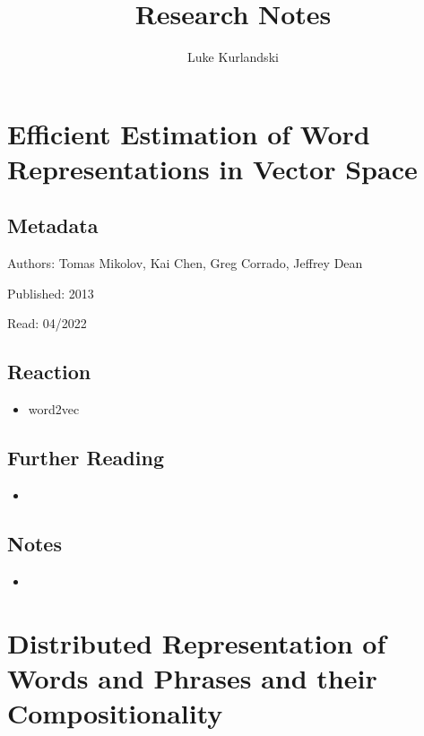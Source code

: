 \documentclass{article}
\title{Research Notes}
\author{Luke Kurlandski}
\begin{document}
\maketitle


\section*{Efficient Estimation of Word Representations in Vector Space}

\subsection*{Metadata}

\noindent Authors: Tomas Mikolov, Kai Chen, Greg Corrado, Jeffrey Dean

\noindent Published: 2013

\noindent Read: 04/2022

\subsection*{Reaction}
\begin{itemize}
\item word2vec
\end{itemize}

\subsection*{Further Reading}
\begin{itemize}
	\item
\end{itemize}

\subsection*{Notes}

\begin{itemize}
	\item
\end{itemize}

\pagebreak


\section*{Distributed Representation of Words and Phrases and their Compositionality}
\end{document}
